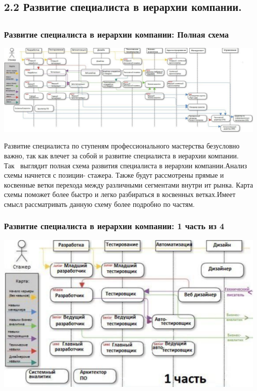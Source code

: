 \documentclass{../industrial-development}
\begin{document}

\subsection{2.2 Развитие  специалиста в иерархии компании.  }

\subsection{}

\begin{frame} \frametitle{Развитие  специалиста в иерархии компании: Полная схема }
  \centerline{\includegraphics[height=0.47\textheight]{11-IT-specialist's-way/sch.pdf}}
\end{frame}

\lecturenotes
Развитие  специалиста по ступеням профессионального мастерства безусловно важно, так как влечет за собой и развитие специалиста в иерархии компании.
Так~\cite{mc} выглядит полная схема развития специалиста в иерархии компании.Анализ схемы начнется с позиции- стажера. Также  будут рассмотрены прямые и косвенные ветки перехода между различными сегментами внутри ит рынка. Карта схемы поможет более быстро и легко разбираться в косвенных ветках.Имеет смысл рассматривать данную схему более подробно по частям.

\begin{frame} \frametitle{Развитие  специалиста в иерархии компании: 1 часть из 4 }
  \centerline{\includegraphics[width=1\linewidth]{11-IT-specialist's-way/sch11.pdf}}
\end{frame}
\end{document}
